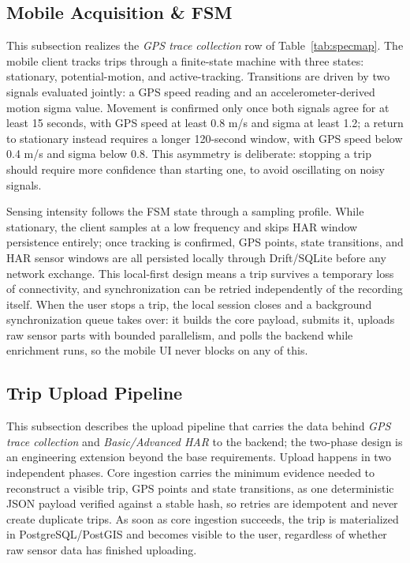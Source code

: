 \documentclass[conference,a4paper]{IEEEtran}
\begin{document}
\subsection{Mobile Acquisition \& FSM}

This subsection realizes the \textit{GPS trace collection} row of Table~\ref{tab:specmap}. The mobile client tracks trips through a finite-state machine with three states: stationary, potential-motion, and active-tracking. Transitions are driven by two signals evaluated jointly: a GPS speed reading and an accelerometer-derived motion sigma value. Movement is confirmed only once both signals agree for at least 15 seconds, with GPS speed at least 0.8 m/s and sigma at least 1.2; a return to stationary instead requires a longer 120-second window, with GPS speed below 0.4 m/s and sigma below 0.8. This asymmetry is deliberate: stopping a trip should require more confidence than starting one, to avoid oscillating on noisy signals.

Sensing intensity follows the FSM state through a sampling profile. While stationary, the client samples at a low frequency and skips HAR window persistence entirely; once tracking is confirmed, GPS points, state transitions, and HAR sensor windows are all persisted locally through Drift/SQLite before any network exchange. This local-first design means a trip survives a temporary loss of connectivity, and synchronization can be retried independently of the recording itself. When the user stops a trip, the local session closes and a background synchronization queue takes over: it builds the core payload, submits it, uploads raw sensor parts with bounded parallelism, and polls the backend while enrichment runs, so the mobile UI never blocks on any of this.

\subsection{Trip Upload Pipeline}

This subsection describes the upload pipeline that carries the data behind \textit{GPS trace collection} and \textit{Basic/Advanced HAR} to the backend; the two-phase design is an engineering extension beyond the base requirements. Upload happens in two independent phases. Core ingestion carries the minimum evidence needed to reconstruct a visible trip, GPS points and state transitions, as one deterministic JSON payload verified against a stable hash, so retries are idempotent and never create duplicate trips. As soon as core ingestion succeeds, the trip is materialized in PostgreSQL/PostGIS and becomes visible to the user, regardless of whether raw sensor data has finished uploading.
\end{document}
